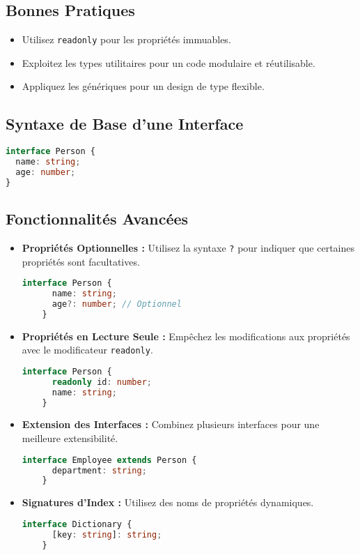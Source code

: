 \documentclass[a4paper,12pt]{article}
\begin{document}
\subsection*{Bonnes Pratiques}
\begin{itemize}
    \item Utilisez \texttt{readonly} pour les propriétés immuables.
    \item Exploitez les types utilitaires pour un code modulaire et réutilisable.
    \item Appliquez les génériques pour un design de type flexible.
\end{itemize}

\subsection*{Syntaxe de Base d’une Interface}
\begin{lstlisting}[language=TypeScript]
interface Person {
  name: string;
  age: number;
}
\end{lstlisting}

\subsection*{Fonctionnalités Avancées}
\begin{itemize}
    \item \textbf{Propriétés Optionnelles :} Utilisez la syntaxe \texttt{?} pour indiquer que certaines propriétés sont facultatives.
    \begin{lstlisting}[language=TypeScript]
    interface Person {
      name: string;
      age?: number; // Optionnel
    }
    \end{lstlisting}
    \item \textbf{Propriétés en Lecture Seule :} Empêchez les modifications aux propriétés avec le modificateur \texttt{readonly}.
    \begin{lstlisting}[language=TypeScript]
    interface Person {
      readonly id: number;
      name: string;
    }
    \end{lstlisting}
    \item \textbf{Extension des Interfaces :} Combinez plusieurs interfaces pour une meilleure extensibilité.
    \begin{lstlisting}[language=TypeScript]
    interface Employee extends Person {
      department: string;
    }
    \end{lstlisting}
    \item \textbf{Signatures d’Index :} Utilisez des noms de propriétés dynamiques.
    \begin{lstlisting}[language=TypeScript]
    interface Dictionary {
      [key: string]: string;
    }
    \end{lstlisting}
\end{itemize}
\end{document}
